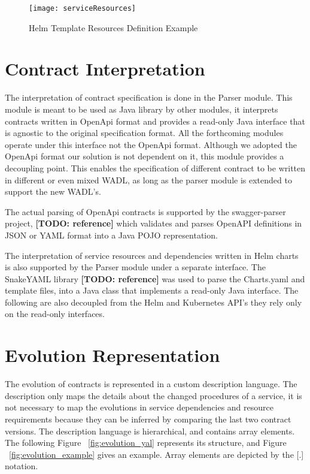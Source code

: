\begin{figure}[htbp]
    \centering
    \texttt{[image: serviceResources]}
    \caption{Helm Template Resources Definition Example}
    \label{fig:serviceResources}
\end{figure}

\newpage

\section{Contract Interpretation} %
\label{sec:contract_interpretation}

The interpretation of contract specification is done in the Parser module.
This module is meant to be used as Java library by other modules,
it interprets contracts written in OpenApi format and provides a read-only Java interface
that is agnostic to the original specification format.
All the forthcoming modules operate under this interface not the OpenApi format.
Although we adopted the OpenApi format our solution is not dependent on it, this module provides a decoupling point.
This enables the specification of different contract to be written in different or even mixed WADL,
as long as the parser module is extended to support the new WADL's.

The actual parsing of OpenApi contracts is supported by the swagger-parser project, \textbf{[TODO: reference]}
which validates and parses OpenAPI definitions in JSON or YAML format into a Java POJO representation.

The interpretation of service resources and dependencies written in Helm charts is also supported by the Parser module under a separate interface.
The SnakeYAML library \textbf{[TODO: reference]} was used to parse the Charts.yaml and template files, into a Java class that implements a read-only Java interface.
The following are also decoupled from the Helm and Kubernetes API's they rely only on the read-only interfaces.

\newpage

\section{Evolution Representation} %
\label{sec:evolution_representation}

The evolution of contracts is represented in a custom description language.
The description only maps the details about the changed procedures of a service,
it is not necessary to map the evolutions in service dependencies and resource requirements because they can be inferred by comparing the last two contract versions.
The description language is hierarchical, and contains array elements.
The following Figure ~\ref{fig:evolution_yal} represents its structure, and Figure ~\ref{fig:evolution_example} gives an example.
Array elements are depicted by the [.] notation.


